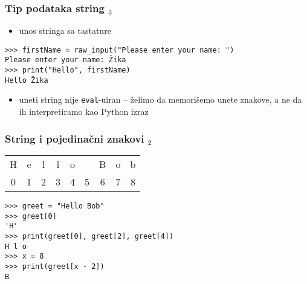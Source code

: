 \documentclass[utf8,compress]{beamer}
\begin{document}
\begin{frame}[fragile]
  \frametitle{Tip podataka string $_3$}
  \begin{itemize}
    \item unos stringa sa tastature
  \end{itemize}
\begin{verbatim}
>>> firstName = raw_input("Please enter your name: ")
Please enter your name: Žika
>>> print("Hello", firstName)
Hello Žika
\end{verbatim}
  \begin{itemize}
    \item uneti string nije \texttt{eval}-uiran -- želimo da memorišemo unete znakove, a ne da ih interpretiramo kao Python izraz
  \end{itemize}
\end{frame}


\begin{frame}[fragile]
  \frametitle{String i pojedinačni znakovi $_2$}
\begin{tabular}{|c|c|c|c|c|c|c|c|c|}
\cline{1-9}
H & e & l & l & o & \  & B & o & b \\ \cline{1-9}
\multicolumn{1}{c}{0} & \multicolumn{1}{c}{1} & \multicolumn{1}{c}{2} & \multicolumn{1}{c}{3} & \multicolumn{1}{c}{4} & \multicolumn{1}{c}{5} & \multicolumn{1}{c}{6} & \multicolumn{1}{c}{7} & \multicolumn{1}{c}{8}
\end{tabular}
\begin{verbatim}
>>> greet = "Hello Bob"
>>> greet[0]
'H'
>>> print(greet[0], greet[2], greet[4])
H l o
>>> x = 8
>>> print(greet[x - 2])
B
\end{verbatim}
\end{frame}
\end{document}
